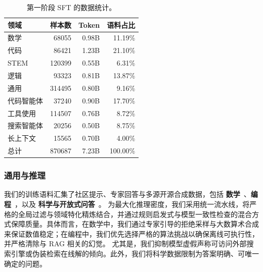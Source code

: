 \begin{table}[t!]
    \centering
    \setlength{\tabcolsep}{4.0pt}
    \begin{tabular}{lrrr}
    \toprule
    \rowcolor{header_gray} \textbf{领域} & \textbf{样本数} & \textbf{Token} & \textbf{语料占比} \\
    \midrule
    数学    & 68055 & 0.98B & 11.19\% \\
    代码    & 86421 & 1.23B & 21.10\% \\
    STEM    & 120399  & 0.55B & 6.31\% \\
    逻辑   & 93323  & 0.81B & 13.87\% \\
    通用 & 314495 & 0.80B & 9.16\% \\
    代码智能体     & 37240 & 0.90B & 17.70\% \\
    工具使用 & 114507 & 0.76B & 8.72\% \\
    搜索智能体
    & 20256 & 0.50B & 8.75\% \\
    长上下文 & 15565 & 0.70B & 4.00\% \\
    \midrule
    总计   & 870687 & 7.23B & 100.00\% \\
    \bottomrule
\end{tabular}
\caption{第一阶段 SFT 的数据统计。}
\label{tab:sft_data_statistics}
\end{table}
\subsubsection{通用与推理}
我们的训练语料汇集了社区提示、专家回答与多源开源合成数据，包括 \textbf{数学}~\cite{li2024numinamath,albalak2025bigmath,mitra2024orcamath,aslawliet2024olympiads,aslawliet2024cnk12,openr12025math220k,deepmath2025deepmath103k,yu2025dapoopensourcellmreinforcement,hu2025openreasonerzero,guha2025openthoughts,muennighoff2025s1simpletesttimescaling,ji2025amthinkingv1advancingfrontierreasoning,limo2025lessismore}、\textbf{编程}~\cite{li2023tacotopicsalgorithmiccode,deepcoder2025,wang2025codecontestshighqualitytestcase}，以及 \textbf{科学与开放式问答}~\cite{li2023camel,bercovich2025llamanemotronefficientreasoningmodels,fan2025megascience,zhao2024wildchat}。
为最大化推理密度，我们采用统一流水线，将严格的全局过滤与领域特化精炼结合，并通过规则启发式与模型一致性检查的混合方式保障质量。具体而言，在数学中，我们通过专家引导的拒绝采样与大数算术合成来保证数值稳定；在编程中，我们优先选择严格的算法挑战以确保离线可执行性，并严格清除与 RAG 相关的幻觉。
尤其是，我们抑制模型虚假声称可访问外部搜索引擎或伪装检索在线解的倾向。此外，我们将科学数据限制为答案明确、可唯一确定的问题。

